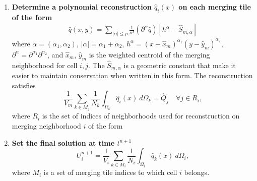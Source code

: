 \begin{enumerate}
\item \textbf{Determine a polynomial reconstruction $\hat q_i(x)$ on 
each merging tile of the form}
\begin{equation}\label{eq:q}
\begin{aligned}
    \hat q (x,y) = \sum_{|\alpha| \leq p}  \frac{1}{\alpha!} (\partial^{\alpha} \hat q) [h^{\alpha}-\hat S_{m, \alpha}]
\end{aligned}
\end{equation}
where $\alpha = (\alpha_1, \alpha_2)$, $|\alpha| = \alpha_1 + \alpha_2$, $h^{\alpha} = (x-\hat x_m)^{\alpha_1}(y-\hat y_m)^{\alpha_2}$, $\partial^{\alpha} = \partial^{\alpha_1}\partial^{\alpha_2}$,
and $\hat x_m$, $\hat y_m$ is the weighted centroid of the merging
neighborhood for cell $i,j$. 
The $ \hat S_{m,\alpha}$ is a geometric
constant that make it easier to maintain conservation when written in
this form.  The reconstruction satisfies
\begin{equation}\label{eq:qi}
\frac{1}{V_m}\sum_{k \in M_j}\frac{1}{N_k}\int_{\Omega_k} \hat q_i(x)~d\Omega_k = \hat Q_j \quad \forall j \in R_i,
\end{equation}
where $R_i$ is the set of indices of neighborhoods used for reconstruction 
on merging neighborhood $i$ of the form


\item \textbf{Set the final solution at time $t^{n+1}$}
	\begin{equation}\label{eq:final_update}
	U^{n+1}_i =  \frac{1}{V_i}\sum_{k \in M_{i}}\frac{1}{N_i}\int_{\Omega_i} \hat q_k(x)~d\Omega_i,
	\end{equation}
	where $M_i$ is a set of merging tile indices to which cell $i$ belongs.
\end{enumerate}

